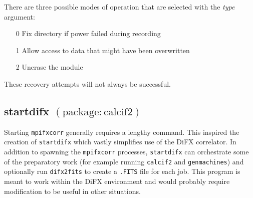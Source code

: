 \noindent
There are three possible modes of operation that are selected with the {\em type} argument:
\begin{itemize}
\item[0] Fix directory if power failed during recording
\item[1] Allow access to data that might have been overwritten
\item[2] Unerase the module
\end{itemize}
These recovery attempts will not always be successful.






\subsection{startdifx {\small $\mathrm{(package: calcif2)}$}} \label{sec:startdifx} 

Starting {\tt mpifxcorr} generally requires a lengthy command.
This inspired the creation of {\tt startdifx} which vastly simplifies use of the DiFX correlator.
In addition to spawning the {\tt mpifxcorr} processes, {\tt startdifx} can orchestrate some of the preparatory work (for example running {\tt calcif2} and {\tt genmachines}) and optionally run {\tt difx2fits} to create a {\tt .FITS} file for each job.
This program is meant to work within the DiFX environment and would probably require modification to be useful in other situations.

